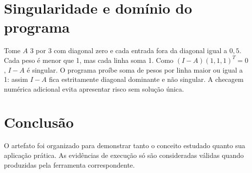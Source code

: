 \documentclass[12pt]{article}
\begin{document}
\section*{Singularidade e domínio do programa}
Tome $A$ 3 por 3 com diagonal zero e cada entrada fora da diagonal igual a $0,5$. Cada peso é menor que 1, mas cada linha soma 1. Como $(I-A)(1,1,1)^T=0$, $I-A$ é singular. O programa proíbe soma de pesos por linha maior ou igual a 1: assim $I-A$ fica estritamente diagonal dominante e não singular. A checagem numérica adicional evita apresentar risco sem solução única.
\section*{Conclusão}
O artefato foi organizado para demonstrar tanto o conceito estudado quanto sua aplicação prática. As evidências de execução só são consideradas válidas quando produzidas pela ferramenta correspondente.
\end{document}
